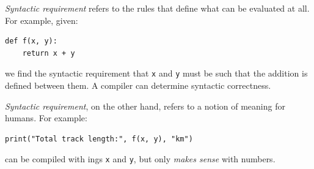 \begin{frame}[fragile]
%
\begin{hintbox}
\footnotesize
\emph{Syntactic requirement} refers to the rules that define what can be evaluated at all. \\
For example, given:
\begin{codebox}
\begin{verbatim}
def f(x, y):
    return x + y
\end{verbatim}
\end{codebox}
we find the syntactic requirement that \texttt{x} and \texttt{y} must be such that the addition is defined between them.
A compiler can determine syntactic correctness.

\vspace{6pt}
\emph{Syntactic requirement}, on the other hand, refers to a notion of meaning for humans. For example:
\begin{codebox}
\begin{verbatim}
print("Total track length:", f(x, y), "km")
\end{verbatim}
\end{codebox}
can be compiled with ings \texttt{x} and \texttt{y}, but only \emph{makes sense} with numbers.
\end{hintbox}
%
\end{frame}


